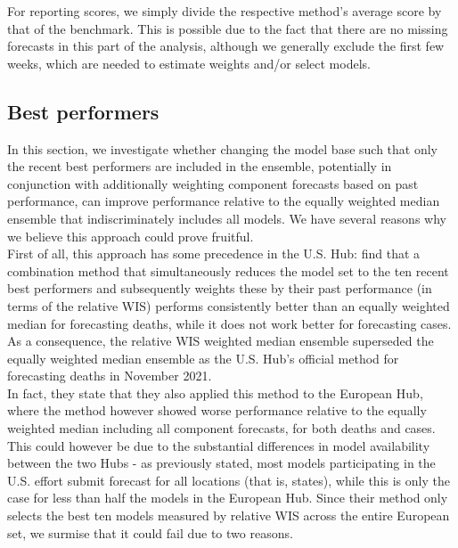 For reporting scores, we simply divide the respective method's average score by that of the benchmark. This is possible due to the fact that there are no missing forecasts in this part of the analysis, although we generally exclude the first few weeks, which are needed to estimate weights and/or select models.\\
\subsection{Best performers} \label{sub:best_performers}
In this section, we investigate whether changing the model base such that only the recent best performers are included in the ensemble, potentially in conjunction with additionally weighting component forecasts based on past performance, can improve performance relative to the equally weighted median ensemble that indiscriminately includes all models. We have several reasons why we believe this approach could prove fruitful. \medskip\\
First of all, this approach has some precedence in the U.S. Hub: \cite{ray_comparing_2022} find that a combination method that simultaneously reduces the model set to the ten recent best performers and subsequently weights these by their past performance (in terms of the relative WIS) performs consistently better than an equally weighted median for forecasting deaths, while it does not work better for forecasting cases. As a consequence, the relative WIS weighted median ensemble superseded the equally weighted median ensemble as the U.S. Hub's official method for forecasting deaths in November 2021.\\ 
In fact, they state that they also applied this method to the European Hub, where the method however showed worse performance relative to the equally weighted median including all component forecasts, for both deaths and cases. This could however be due to the substantial differences in model availability between the two Hubs - as previously stated, most models participating in the U.S. effort submit forecast for all locations (that is, states), while this is only the case for less than half the models in the European Hub. Since their method only selects the best ten models measured by relative WIS across the entire European set, we surmise that it could fail due to two reasons.\\
